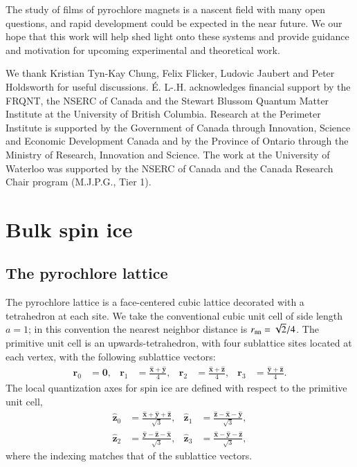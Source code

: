\documentclass[aps,prx,reprint,runinaddress,superscriptaddress,amsmath,amssymb,floatfix,longbibliography]{revtex4-1}
\renewcommand{\vec}[1]{\boldsymbol{#1}}
\newcommand{\vhat}[1]{\vec{\hat{#1}}}
\begin{document}
The study of films of pyrochlore magnets is a nascent field with many open questions, and rapid development could be expected in the near future. We our hope that this work will help shed light onto these systems and provide guidance and motivation for upcoming experimental and theoretical work.


\begin{acknowledgments}
We thank Kristian Tyn-Kay Chung, Felix Flicker, Ludovic Jaubert and Peter Holdsworth for useful discussions. \'{E}. L-.H. acknowledges financial support by the FRQNT, the NSERC of Canada and the Stewart Blussom Quantum Matter Institute at the University of British Columbia. Research at the Perimeter Institute is supported by the Government of Canada through Innovation, Science and Economic Development Canada and by the Province of Ontario through the Ministry of Research, Innovation and Science.
The work at the University of Waterloo was supported by the NSERC of Canada and the Canada Research Chair program (M.J.P.G., Tier 1).
\end{acknowledgments}


\appendix
	
\section{Bulk spin ice}
\label{app:bulk}
	
\subsection{The pyrochlore lattice}

The pyrochlore lattice is a face-centered cubic lattice decorated with a tetrahedron at each site. We take the conventional cubic unit cell of side length $a = 1$; in this convention the nearest neighbor distance is $r_{\rm nn} = \sqrt{2}/4$. The primitive unit cell is an upwards-tetrahedron, with four sublattice sites located at each vertex, with the following sublattice vectors:
\begin{align}
    \vec{r}_0 &= \vec{0}, & 
    \vec{r}_1 &= \frac{\vhat{x}+\vhat{y}}{4}, &
    \vec{r}_2 &= \frac{\vhat{x}+\vhat{z}}{4}, &
    \vec{r}_3 &= \frac{\vhat{y}+\vhat{z}}{4}. 
\end{align}
The local quantization axes for spin ice are defined with respect to the primitive unit cell,
\begin{align}
    \vhat{z}_0 &= \frac{\vhat{x}+\vhat{y}+\vhat{z}}{\sqrt{3}}, &
    \vhat{z}_1 &= \frac{\vhat{z}-\vhat{x}-\vhat{y}}{\sqrt{3}}, \nonumber \\
    \vhat{z}_2 &= \frac{\vhat{y}-\vhat{z}-\vhat{x}}{\sqrt{3}}, &
    \vhat{z}_3 &= \frac{\vhat{x}-\vhat{y}-\vhat{z}}{\sqrt{3}}, 
\end{align}	
where the indexing matches that of the sublattice vectors.
\end{document}
